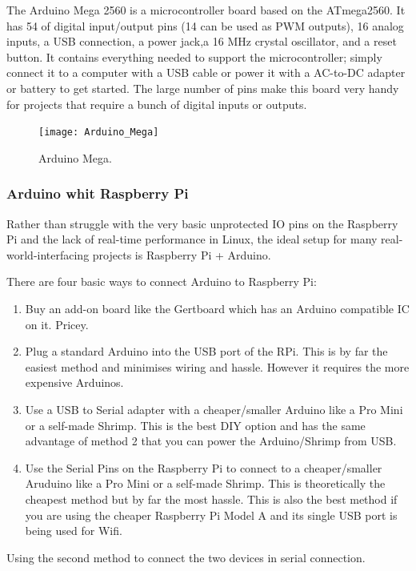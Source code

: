 The Arduino Mega 2560 is a microcontroller board based on the ATmega2560. It has 54 of digital input/output pins (14 can be used as PWM outputs), 16 analog inputs, a USB connection, a power jack,a 16 MHz crystal oscillator, and a reset button. It contains everything needed to support the microcontroller; simply connect it to a computer with a USB cable or power it with a AC-to-DC adapter or battery to get started. The large number of pins make this board very handy for projects that require a bunch of digital inputs or outputs.


\begin{figure}[h]		
	\centering
	\texttt{[image: Arduino\_Mega]}
	\caption{Arduino Mega.}
	\label{Fig:Mega}
\end{figure}

		\subsubsection{Arduino whit Raspberry Pi} 
		
		Rather than struggle with the very basic unprotected IO pins on the Raspberry Pi and the lack of real-time performance in Linux, the ideal setup for many real-world-interfacing projects is Raspberry Pi + Arduino.
		
		There are four basic ways to connect Arduino to Raspberry Pi:
		\begin{enumerate}
			\item Buy an add-on board like the Gertboard which has an Arduino compatible IC on it. Pricey.
			\item Plug a standard Arduino into the USB port of the RPi. This is by far the easiest method and minimises wiring and hassle. However it requires the more expensive Arduinos.
			\item Use a USB to Serial adapter with a cheaper/smaller Arduino like a Pro Mini or a self-made Shrimp. This is the best DIY option and has the same advantage of method 2 that you can power the Arduino/Shrimp from USB.
			\item Use the Serial Pins on the Raspberry Pi to connect to a cheaper/smaller Aruduino like a Pro Mini or a self-made Shrimp. This is theoretically the cheapest method but by far the most hassle. This is also the best method if you are using the cheaper Raspberry Pi Model A and its single USB port is being used for Wifi.
		\end{enumerate}	
		Using the second method to connect the two devices in serial connection.
		
